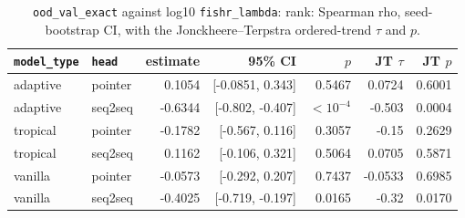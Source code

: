 \documentclass[10pt]{article}
\begin{document}
{\small
\begin{longtable}{llrrrrr}
\caption{\texttt{ood\_val\_exact} against log10 \texttt{fishr\_lambda}: rank: Spearman rho, seed-bootstrap CI, with the Jonckheere--Terpstra ordered-trend $\tau$ and $p$.}\label{tab:trend-ood_val_exact}\\
\toprule
\texttt{model\_type} & \texttt{head} & estimate & 95\% CI & $p$ & JT $\tau$ & JT $p$\\
\midrule
\endhead
adaptive & pointer & 0.1054 & [-0.0851, 0.343] & 0.5467 & 0.0724 & 0.6001\\
adaptive & seq2seq & -0.6344 & [-0.802, -0.407] & $<10^{-4}$ & -0.503 & 0.0004\\
tropical & pointer & -0.1782 & [-0.567, 0.116] & 0.3057 & -0.15 & 0.2629\\
tropical & seq2seq & 0.1162 & [-0.106, 0.321] & 0.5064 & 0.0705 & 0.5871\\
vanilla & pointer & -0.0573 & [-0.292, 0.207] & 0.7437 & -0.0533 & 0.6985\\
vanilla & seq2seq & -0.4025 & [-0.719, -0.197] & 0.0165 & -0.32 & 0.0170\\
\bottomrule
\end{longtable}
}
\end{document}
